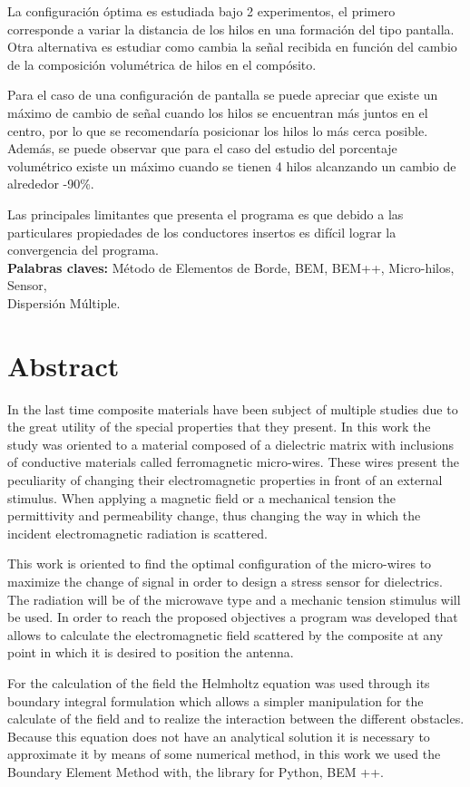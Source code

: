 \documentclass[12pt,letterpaper]{article}
\numberwithin{equation}{section}
\begin{document}
La configuración óptima es estudiada bajo 2 experimentos, el primero corresponde a variar la distancia de los hilos en una formación del tipo pantalla. Otra alternativa es estudiar como cambia la señal recibida en función del cambio de la composición volumétrica de hilos en el compósito.

Para el caso de una configuración de pantalla se puede apreciar que existe un máximo de cambio de señal cuando los hilos se encuentran más juntos en el centro, por lo que se recomendaría posicionar los hilos lo más cerca posible. Además, se puede observar que para el caso del estudio del porcentaje volumétrico existe un máximo cuando se tienen 4 hilos alcanzando un cambio de alrededor -90\%.

Las principales limitantes que presenta el programa es que debido a las particulares propiedades de los conductores insertos es difícil lograr la convergencia del programa.\\

\noindent\textbf{Palabras claves:} Método de Elementos de Borde, BEM, BEM++, Micro-hilos, Sensor,\\ Dispersión Múltiple.
\pagebreak
\section*{Abstract}
In the last time composite materials have been subject of multiple studies due to the great utility of the special properties that they present. In this work the study was oriented to a material composed of a dielectric matrix with inclusions of conductive materials called ferromagnetic micro-wires. These wires present the peculiarity of changing their electromagnetic properties in front of an external stimulus. When applying a magnetic field or a mechanical tension the permittivity and permeability change, thus changing the way in which the incident electromagnetic radiation is scattered.

This work is oriented to find the optimal configuration of the micro-wires to maximize the change of signal in order to design a stress sensor for dielectrics. The radiation will be of the microwave type and a mechanic tension stimulus will be used. In order to reach the proposed objectives a program was developed that allows to calculate the electromagnetic field scattered by the composite at any point in which it is desired to position the antenna.

For the calculation of the field the Helmholtz equation was used through its boundary integral formulation which allows a simpler manipulation for the calculate of the field and to realize the interaction between the different obstacles. Because this equation does not have an analytical solution it is necessary to approximate it by means of some numerical method, in this work we used the Boundary Element Method with, the library for Python, BEM ++.
\end{document}
